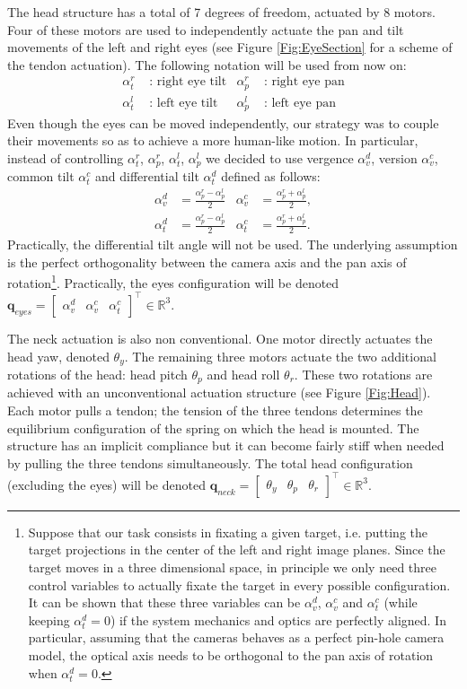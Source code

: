 The head structure has a total of 7 degrees of freedom, actuated by 8 motors. Four of these motors are used to independently actuate the pan and tilt movements of the left and right eyes (see Figure \ref{Fig:EyeSection} for a scheme of the tendon actuation). The following notation will be used from now on:
\begin{align*}
\alpha_t^r & \mbox{ : } \mbox{right eye tilt} & \alpha_p^r & \mbox{ : } \mbox{right eye pan}\\
\alpha_t^l & \mbox{ : } \mbox{left eye tilt} & \alpha_p^l & \mbox{ : } \mbox{left eye pan}
\end{align*}
Even though the eyes can be moved independently, our strategy was to couple their movements so as to achieve a more human-like motion. In particular, instead of controlling $\alpha_t^r$, $\alpha_p^r$, $\alpha_t^l$, $\alpha_p^l$ we decided to use vergence $\alpha_v^d$, version $\alpha_v^c$, common tilt $\alpha_t^c$ and differential tilt $\alpha_t^d$ defined as follows:
\begin{align*}
\alpha_v^d & = \frac{\alpha_p^r - \alpha_p^l}{2} & \alpha_v^c & = \frac{\alpha_p^r + \alpha_p^l}{2},\\
\alpha_t^d & = \frac{\alpha_p^r - \alpha_p^l}{2} & \alpha_t^c & = \frac{\alpha_p^r + \alpha_p^l}{2}.
\end{align*}
Practically, the differential tilt angle will not be used. The underlying assumption is the perfect orthogonality between the camera axis and the pan axis of rotation\footnote{Suppose that our task consists in fixating a given target, i.e. putting the target projections in the center of the left and right image planes. Since the target moves in a three dimensional space, in principle we only need three control variables to actually fixate the target in every possible configuration. It can be shown that these three variables can be $\alpha_v^d$, $\alpha_v^c$ and $\alpha_t^c$ (while keeping $\alpha_t^d=0$) if the system mechanics and optics are perfectly aligned. In particular, assuming that the cameras behaves as a perfect pin-hole camera model, the optical axis needs to be orthogonal to the pan axis of rotation when $\alpha_t^d=0$.}. Practically, the eyes configuration will be denoted $\mathbf q_{eyes} = \begin{bmatrix} \alpha_v^d & \alpha_v^c & \alpha_t^c \end{bmatrix}^\top \in \mathbb R^3$.


The neck actuation is also non conventional. One motor directly actuates the head yaw, denoted $\theta_y$. The remaining three motors actuate the two additional rotations of the head: head pitch $\theta_p$ and head roll $\theta_r$. These two rotations are achieved with an unconventional actuation structure (see Figure \ref{Fig:Head}). Each motor pulls a tendon; the tension of the three tendons determines the equilibrium configuration of the spring on which the head is mounted. The structure has an implicit compliance but it can become fairly stiff when needed by pulling the three tendons simultaneously. The total head configuration (excluding the eyes) will be denoted $\mathbf q_{neck} = \begin{bmatrix} \theta_y & \theta_p & \theta_r \end{bmatrix}^\top \in \mathbb R^3$.

